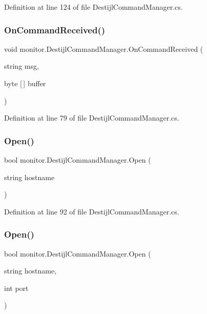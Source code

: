 Definition at line 124 of file Destijl\+Command\+Manager.\+cs.

\mbox{\label{classmonitor_1_1_destijl_command_manager_ab83dbda4196240c242a5ac101901bb19}} 
\subsubsection{On\+Command\+Received()}
{\footnotesize\ttfamily void monitor.\+Destijl\+Command\+Manager.\+On\+Command\+Received (\begin{DoxyParamCaption}\item[{string}]{msg,  }\item[{byte [$\,$]}]{buffer }\end{DoxyParamCaption})\hspace{0.3cm}{\ttfamily [private]}}



Definition at line 79 of file Destijl\+Command\+Manager.\+cs.

\mbox{\label{classmonitor_1_1_destijl_command_manager_a5dd6b75386a554c2f026eee787477bb0}} 
\subsubsection{Open()\hspace{0.1cm}{\footnotesize\ttfamily [1/2]}}
{\footnotesize\ttfamily bool monitor.\+Destijl\+Command\+Manager.\+Open (\begin{DoxyParamCaption}\item[{string}]{hostname }\end{DoxyParamCaption})}



Definition at line 92 of file Destijl\+Command\+Manager.\+cs.

\mbox{\label{classmonitor_1_1_destijl_command_manager_a842300511efb20783c271764ee0e3336}} 
\subsubsection{Open()\hspace{0.1cm}{\footnotesize\ttfamily [2/2]}}
{\footnotesize\ttfamily bool monitor.\+Destijl\+Command\+Manager.\+Open (\begin{DoxyParamCaption}\item[{string}]{hostname,  }\item[{int}]{port }\end{DoxyParamCaption})}



